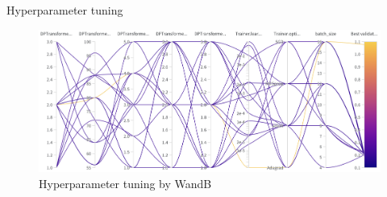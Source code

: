 \documentclass{beamer}
\begin{document}
\begin{frame}{Hyperparameter tuning}
    \begin{figure}
        \hspace{-0.5cm}
        \centering
        \includegraphics[scale=.4]{MA_presentation/figures/evaluation_hyperparameters_tuning.png}
        \caption{Hyperparameter tuning by WandB \cite{wandb_site_2025}}
        \label{Hyperparameters tuning by WandB}
    \end{figure}

\end{frame}


\end{document}
